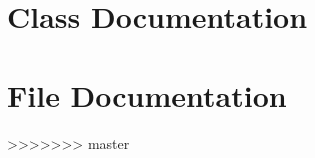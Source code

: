 \documentclass[twoside]{book}
\begin{document}
\chapter{Class Documentation}





\chapter{File Documentation}













>>>>>>> master

\newpage
{}
{}
\printindex
\end{document}
